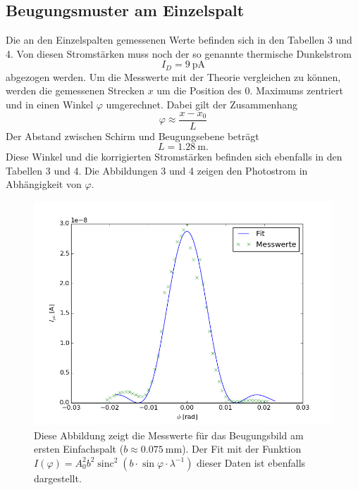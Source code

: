 \documentclass[11pt,ngerman,a4paper]{article}
\begin{document}
\subsection{Beugungsmuster am Einzelspalt}

Die an den Einzelspalten gemessenen Werte befinden sich in den Tabellen 3 und 4. Von diesen Stromstärken muss noch der so genannte thermische Dunkelstrom
\[
I_D = \SI{9}{\pico\ampere}
\]
abgezogen werden. Um die Messwerte mit der Theorie vergleichen zu können, werden die gemessenen Strecken $x$ um die Position des 0. Maximums zentriert und in einen Winkel $\varphi$ umgerechnet. Dabei gilt der Zusammenhang
\[
\varphi \approx \frac{x-x_0}{L}
\]
Der Abstand zwischen Schirm und Beugungsebene beträgt
\[
L = \SI{1.28}{\meter} \mathrm{.}
\]
Diese Winkel und die korrigierten Stromstärken befinden sich ebenfalls in den Tabellen 3 und 4. Die Abbildungen 3 und 4 zeigen den Photostrom in Abhängigkeit von $\varphi$.
\begin{figure}[H]
\centering
\includegraphics[scale=0.8]{plot0.png}
\caption{Diese Abbildung zeigt die Messwerte für das Beugungsbild am ersten Einfachspalt ($b \approx \SI{0.075}{\milli\meter}$). Der Fit mit der Funktion $I(\varphi) = A_0^2b^2\operatorname{sinc}^2(b\cdot\sin\varphi\cdot\lambda^{-1})$  dieser Daten ist ebenfalls dargestellt.}
\label{plot0}
\end{figure}
\end{document}
